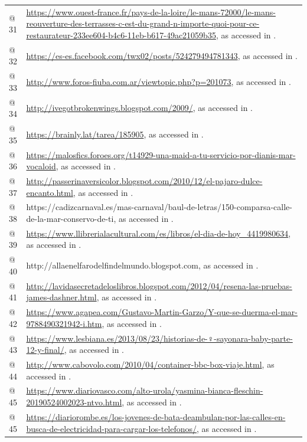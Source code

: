 \begin{tabularx}{\textwidth}{XX}
@ 31 & \url{https://www.ouest-france.fr/pays-de-la-loire/le-mans-72000/le-mans-reouverture-des-terrasses-c-est-du-grand-n-importe-quoi-pour-ce-restaurateur-233ee604-b4c6-11eb-b617-49ac21059b35}, as accessed in \citealt{May2021}.\\
@ 32 & \url{https://es-es.facebook.com/twx02/posts/524279494781343}, as accessed in \citealt{June2021}.\\
@ 33 & \url{http://www.foros-fiuba.com.ar/viewtopic.php?p=201073}{, as accessed in \citealt{May2021}.}\\
@ 34 & \url{http://ivegotbrokenwings.blogspot.com/2009/}, as accessed in \citealt{May2021}.\\
@ 35 & \url{https://brainly.lat/tarea/185905}, as accessed in \citealt{Fabruar2021}.\\
@ 36 & \url{https://malosfics.foroes.org/t14929-una-maid-a-tu-servicio-por-dianis-mar-vocaloid}, as accessed in \citealt{May2021}.\\
@ 37 & \url{http://passerinaversicolor.blogspot.com/2010/12/el-pajaro-dulce-encanto.html}, as accessed in \citealt{Februar2021}.\\
@ 38 & https://cadizcarnaval.es/mas-carnaval/baul-de-letras/150-comparsa-calle-de-la-mar-conservo-de-ti, as accessed in \citealt{Februar2021}.\\
@ 39 & \url{https://www.llibrerialacultural.com/es/libros/el-dia-de-hoy_4419980634}, as accessed in \citealt{June2021}.\\
@ 40 & http://allaenelfarodelfindelmundo.blogspot.com,  as accessed in \citealt{December2020}.\\
@ 41 & \url{http://lavidasecretadeloslibros.blogspot.com/2012/04/resena-las-pruebas-james-dashner.html}, as accessed in \citealt{December2020}.\\
@ 42 & \url{https://www.agapea.com/Gustavo-Martin-Garzo/Y-que-se-duerma-el-mar-9788490321942-i.htm}, as accessed in \citealt{December2020}.\\
@ 43 & \url{https://www.lesbiana.es/2013/08/23/historias-de-♀-sayonara-baby-parte-12-y-final/}, as accessed in \citealt{December2020}.\\
@ 44 & \url{http://www.cabovolo.com/2010/04/container-bbc-box-viaje.html}, as accessed in \citealt{Februar2021}.\\
@ 45 & \url{https://www.diariovasco.com/alto-urola/yasmina-bianca-fleschin-20190524002023-ntvo.html}, as accessed in \citealt{June2021}.\\
@ 45 & \url{https://diariorombe.es/los-jovenes-de-bata-deambulan-por-las-calles-en-busca-de-electricidad-para-cargar-los-telefonos/}, as accessed in \citealt{June2021}.\\

\end{tabularx}
